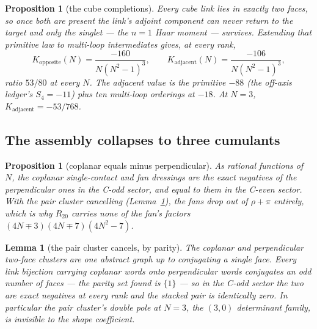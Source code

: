 \documentclass[11pt]{article}
\newtheorem{proposition}[theorem]{Proposition}
\newtheorem{lemma}[theorem]{Lemma}
\theoremstyle{definition}
\theoremstyle{remark}
\newcommand{\chk}[1]{}
\begin{document}
\begin{proposition}[the cube completions]\label{prop:cubes}
Every cube link lies in exactly two faces, so once both are present the link's
adjoint component can never return to the target and only the singlet --- the
$n=1$ Haar moment --- survives. Extending that primitive law to multi-loop
intermediates gives, at every rank,
\begin{equation}\label{eq:cubes}
  K_{\mathrm{opposite}}(N)=\frac{-160}{N(N^2-1)^3},\qquad
  K_{\mathrm{adjacent}}(N)=\frac{-106}{N(N^2-1)^3},
\end{equation}
ratio $53/80$ at every $N$. The adjacent value is the primitive $-88$ (the
off-axis ledger's $S_4=-11$) plus ten multi-loop orderings at $-18$. At $N=3$,
$K_{\mathrm{adjacent}}=-53/768$.\chk{the adjacent-face cube completion is -106/(N(N\^{}2-1)\^{}3): the primitive -88 plus ten multi-loop histories at -18}
\end{proposition}

\subsection{The assembly collapses to three cumulants}

\begin{proposition}[coplanar equals minus perpendicular]\label{prop:coplanar}
As rational functions of $N$, the coplanar single-contact and fan dressings are
the exact negatives of the perpendicular ones in the C-odd sector, and equal to
them in the C-even sector. With the pair cluster cancelling
(Lemma~\ref{lem:pair}), the fans drop out of $\rho+\pi$ entirely, which is why
$R_{20}$ carries none of the fan's factors
$(4N\mp3)(4N\mp7)(4N^2-7)$.\chk{the coplanar dressings are the exact negatives of the perpendicular ones in Q(N), single contact and fan alike, so the eleven-cumulant assembly is three cumulants and the cube: beta\_N = -16u + 32d - 16 corner + 848/(N(N\^{}2-1)\^{}3)}
\end{proposition}

\begin{lemma}[the pair cluster cancels, by parity]\label{lem:pair}
The coplanar and perpendicular two-face clusters are \emph{one} abstract graph
up to conjugating a single face. Every link bijection carrying coplanar words
onto perpendicular words conjugates an odd number of faces --- the parity set
found is $\{1\}$ --- so in the C-odd sector the two are exact negatives at
every rank and the stacked pair is identically zero. In particular the pair
cluster's double pole at $N=3$, the $(3,0)$ determinant family, is invisible to
the shape coefficient.\chk{the coplanar and perpendicular two-face clusters are one abstract graph up to conjugating Q, so their C-odd pair elements are exact negatives at every rank and the pair cluster drops out of C\_shp}
\end{lemma}
\end{document}
